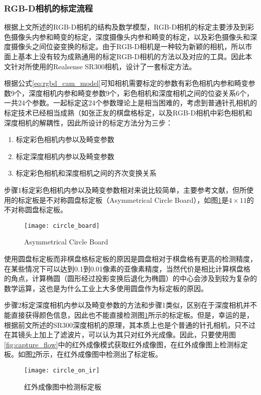 \subsubsection{RGB-D相机的标定流程}
根据上文所述的RGB-D相机的结构及数学模型，RGB-D相机的标定主要涉及到彩色摄像头内参和畸变的标定，深度摄像头内参和畸变的标定，以及彩色摄像头和深度摄像头之间位姿变换的标定。由于RGB-D相机是一种较为新颖的相机，所以市面上基本上没有较为成熟通用的标定RGB-D相机的方法以及对应的工具。因此本文针对所使用的Realsense SR300相机，设计了一套标定方法。

根据公式\ref{eq:rgbd_cam_model}可知相机需要标定的参数有彩色相机内参和畸变参数9个，深度相机内参和畸变参数9个，彩色相机和深度相机之间的位姿关系6个，一共24个参数。一起标定这24个参数理论上是相当困难的，考虑到普通针孔相机的标定技术已经相当成熟（如张正友的棋盘格标定\cite{Zhang2002}，以及RGB-D相机中彩色相机和深度相机的解耦性，因此所设计的标定方法分为三步：
\begin{enumerate}[  Step 1]
\item 标定彩色相机内参以及畸变参数
\item 标定深度相机内参以及畸变参数
\item 标定彩色相机和深度相机之间的齐次变换关系
\end{enumerate}

步骤1标定彩色相机内参以及畸变参数相对来说比较简单，主要参考文献\cite{Zhang2002}，但所使用的标定板是不对称圆盘标定板（Asymmetrical Circle Board），如图\ref{fig:circle_board}是$4\times 11$的不对称圆盘标定板。
\begin{figure}[!ht]
  \centering
  \texttt{[image: circle\_board]}
  \caption{Asymmetrical Circle Board}
  \label{fig:circle_board}
\end{figure}
使用圆盘标定板而非棋盘格标定板的原因是圆盘相对于棋盘格有更高的检测精度，在某些情况下可以达到0.1到0.01像素的亚像素精度，当然代价是相比计算棋盘格的角点，计算椭圆（圆形经过投影变换后退化为椭圆）的中心会涉及到较为复杂的数学运算，这也是为什么工业上大多使用圆盘作为标定板的原因。

步骤2标定深度相机内参以及畸变参数的方法和步骤1类似，区别在于深度相机并不能直接获得颜色信息，因此也不能直接检测图\ref{fig:circle_board}所示的标定板。但是，幸运的是，根据前文所述的SR300深度相机的原理，其本质上也是个普通的针孔相机，只不过在其镜头上加上了滤波片，可以认为其只对红外光成像。因此，只要使用图\ref{fig:capture_flow}中的红外成像模式获取红外成像图，在红外成像图上检测标定板。如图\ref{fig:circle_on_ir}所示，在红外成像图中检测出了标定板。
\begin{figure}[!ht]
  \centering
  \texttt{[image: circle\_on\_ir]}
  \caption{红外成像图中检测标定板}
  \label{fig:circle_on_ir}
\end{figure}

